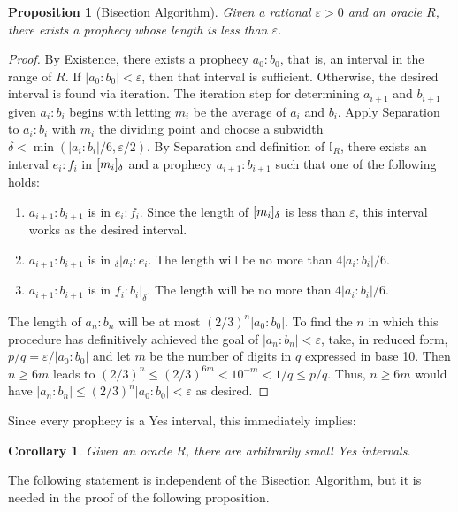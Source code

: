 \documentclass[12pt]{article}
\newtheorem{corollary}{Corollary}[section]
\newtheorem{proposition}{Proposition}[section]
\begin{document}
\begin{proposition}[Bisection Algorithm]
    Given a rational $\varepsilon >0$ and an oracle $R$, there exists a prophecy whose length is less than $\varepsilon$.
\end{proposition}

\begin{proof}
    By Existence, there exists a prophecy $a_0:b_0$, that is, an interval in the range of $R$. If $|a_0:b_0| < \varepsilon$, then that interval is sufficient. Otherwise, the desired interval is found via iteration. The iteration step for determining $a_{i+1}$ and $b_{i+1}$ given $a_i:b_i$ begins with letting $m_i$ be the average of $a_i$ and $b_i$. Apply Separation to $a_i:b_i$ with $m_i$ the dividing point and choose a subwidth $\delta < \min(|a_i:b_i|/6, \varepsilon /2)$. By Separation and definition of $\mathbb{I}_R$, there exists an interval $e_i:f_i$ in $[m_i]_{\delta}$ and a prophecy $a_{i+1}:b_{i+1}$ such that one of the following holds: 
    \begin{enumerate}
        \item $a_{i+1}:b_{i+1}$ is in $e_i:f_i$. Since the length of $[m_i]_{\delta}$ is less than $\varepsilon$, this interval works as the desired interval.  
        \item  $a_{i+1}:b_{i+1}$ is in ${}_\delta|a_i :e_i$. The length will be no more than $4|a_i:b_i|/6$.
        \item  $a_{i+1}:b_{i+1}$ is in $f_i:b_i|_\delta$. The length will be no more than $4|a_i:b_i|/6$.
    \end{enumerate}
    The length of $a_n:b_n$ will be at most $(2/3)^n |a_0:b_0|$. To find the $n$ in which this procedure has definitively achieved the goal of $|a_n:b_n|<\varepsilon$,  take, in reduced form, $p/q = \varepsilon/|a_0:b_0|$ and let $m$ be the number of digits in $q$ expressed in base 10. Then $n \geq  6m$ leads to  $(2/3)^n \leq (2/3)^{6m} < 10^{-m} < 1/q \leq p/q$. Thus, $n \geq 6m$ would have $|a_n:b_n| \leq (2/3)^n |a_0:b_0| < \varepsilon$ as desired. 
\end{proof}

Since every prophecy is a Yes interval, this immediately implies:
\begin{corollary}
    Given an oracle $R$, there are arbitrarily small Yes intervals. 
\end{corollary}

The following statement is independent of the Bisection Algorithm, but it is needed in the proof of the following proposition. 
\end{document}
